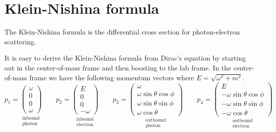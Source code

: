 

\section*{Klein-Nishina formula}

The Klein-Nishina formula is the differential cross section for photon-electron scattering.

\begin{center}
\end{center}

It is easy to derive the Klein-Nishina formula from Dirac's equation by starting
out in the center-of-mass frame and then boosting to the lab frame.
In the center-of-mass frame we have the following momentum vectors where $E=\sqrt{\omega^2+m^2}$.
\begin{equation*}
p_1=\underset{\substack{\text{inbound}\\ \text{photon}}}
{\begin{pmatrix}\omega\\0\\0\\ \omega\end{pmatrix}}
\qquad
p_2=\underset{\substack{\text{inbound}\\ \text{electron}}}
{\begin{pmatrix}E\\0\\0\\-\omega\end{pmatrix}}
\qquad
p_3=\underset{\substack{\text{outbound}\\ \text{photon}}}
{\begin{pmatrix}
\omega\\
\omega\sin\theta\cos\phi\\
\omega\sin\theta\sin\phi\\
\omega\cos\theta
\end{pmatrix}}
\qquad
p_4=\underset{\substack{\text{outbound}\\ \text{electron}}}
{\begin{pmatrix}
E\\
-\omega\sin\theta\cos\phi\\
-\omega\sin\theta\sin\phi\\
-\omega\cos\theta
\end{pmatrix}}
\end{equation*}

